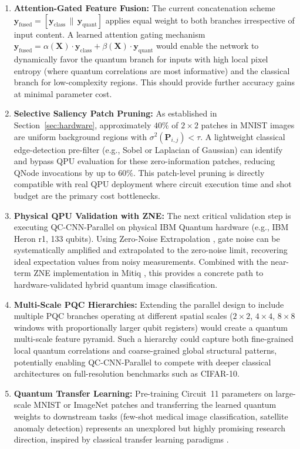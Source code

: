 \documentclass[journal]{IEEEtran}
\begin{document}
\begin{enumerate}
    \item \textbf{Attention-Gated Feature Fusion:} The current concatenation scheme $\mathbf{y}_{\mathrm{fused}} = [\mathbf{y}_{\mathrm{class}} \,\|\, \mathbf{y}_{\mathrm{quant}}]$ applies equal weight to both branches irrespective of input content. A learned attention gating mechanism $\mathbf{y}_{\mathrm{fused}} = \alpha(\mathbf{X}) \cdot \mathbf{y}_{\mathrm{class}} + \beta(\mathbf{X}) \cdot \mathbf{y}_{\mathrm{quant}}$ would enable the network to dynamically favor the quantum branch for inputs with high local pixel entropy (where quantum correlations are most informative) and the classical branch for low-complexity regions. This should provide further accuracy gains at minimal parameter cost.

    \item \textbf{Selective Saliency Patch Pruning:} As established in Section~\ref{sec:hardware}, approximately $40\%$ of $2 \times 2$ patches in MNIST images are uniform background regions with $\sigma^2(\mathbf{P}_{i,j}) < \tau$. A lightweight classical edge-detection pre-filter (e.g., Sobel or Laplacian of Gaussian) can identify and bypass QPU evaluation for these zero-information patches, reducing QNode invocations by up to $60\%$. This patch-level pruning is directly compatible with real QPU deployment where circuit execution time and shot budget are the primary cost bottlenecks.

    \item \textbf{Physical QPU Validation with ZNE:} The next critical validation step is executing QC-CNN-Parallel on physical IBM Quantum hardware (e.g., IBM Heron r1, 133 qubits). Using Zero-Noise Extrapolation \cite{temme2017error, koczor2021exponential}, gate noise can be systematically amplified and extrapolated to the zero-noise limit, recovering ideal expectation values from noisy measurements. Combined with the near-term ZNE implementation in Mitiq \cite{cai2025quantum}, this provides a concrete path to hardware-validated hybrid quantum image classification.

    \item \textbf{Multi-Scale PQC Hierarchies:} Extending the parallel design to include multiple PQC branches operating at different spatial scales ($2 \times 2$, $4 \times 4$, $8 \times 8$ windows with proportionally larger qubit registers) would create a quantum multi-scale feature pyramid. Such a hierarchy could capture both fine-grained local quantum correlations and coarse-grained global structural patterns, potentially enabling QC-CNN-Parallel to compete with deeper classical architectures on full-resolution benchmarks such as CIFAR-10.

    \item \textbf{Quantum Transfer Learning:} Pre-training Circuit~11 parameters on large-scale MNIST or ImageNet patches and transferring the learned quantum weights to downstream tasks (few-shot medical image classification, satellite anomaly detection) represents an unexplored but highly promising research direction, inspired by classical transfer learning paradigms \cite{biamonte2017quantum, dunjko2018machine}.
\end{enumerate}
\end{document}
